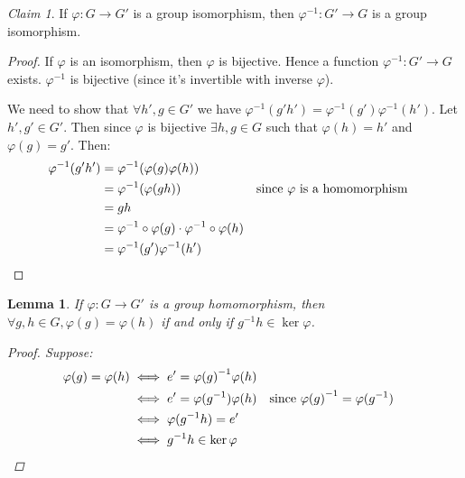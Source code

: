 \documentclass[12pt,letterpaper,DIV=11,final]{scrartcl}
\theoremstyle{plain}
\newtheorem{lemma}[theorem]{Lemma}
\theoremstyle{definition}
\theoremstyle{remark}
\newtheorem{claim}{Claim}
\begin{document}
\begin{claim}
  If $\varphi : G \to G'$ is a group isomorphism, then $\varphi^{-1} : G' \to G$ is a group isomorphism.

  \begin{proof}
    If $\varphi$ is an isomorphism, then $\varphi$ is bijective.
    Hence a function $\varphi^{-1} : G' \to G$ exists.
    $\varphi^{-1}$ is bijective (since it's invertible with inverse $\varphi$).

    We need to show that $\forall h', g \in G'$ we have $\varphi^{-1}(g' h') = \varphi^{-1}(g') \varphi^{-1}(h')$.
    Let $h', g' \in G'$.
    Then since $\varphi$ is bijective $\exists h, g \in G$ such that $\varphi(h) = h'$ and $\varphi(g) = g'$.
    Then: \begin{align*}
      \varphi^{-1}(g' h') &= \varphi^{-1}( \varphi(g) \varphi(h) ) \\
                          &= \varphi^{-1}(\varphi(gh)) & \text{since $\varphi$ is a homomorphism} \\
                          &= gh \\
                          &= \varphi^{-1} \circ \varphi(g) \cdot \varphi^{-1} \circ \varphi(h) \\
                          &= \varphi^{-1}(g') \varphi^{-1}(h') && \qedhere
    \end{align*}
  \end{proof}
\end{claim}

\begin{lemma}
  If $\varphi : G \to G'$ is a group homomorphism, then $\forall g, h \in G, \varphi(g) = \varphi(h)$ if and only if $g^{-1} h \in \ker \varphi$.

  \begin{proof}
    Suppose:
    \begin{align*}
      \varphi(g) = \varphi(h) &\iff e' = {\varphi(g)}^{-1} \varphi(h) \\
                              &\iff e' = \varphi(g^{-1}) \varphi(h) & \text{since ${\varphi(g)}^{-1} = \varphi(g^{-1})$} \\
                              &\iff \varphi(g^{-1} h) = e' \\
                              &\iff g^{-1} h \in \ker \varphi && \qedhere
    \end{align*}
  \end{proof}
\end{lemma}
\end{document}

